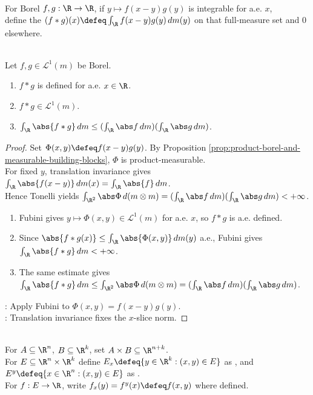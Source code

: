 \begin{definition} \label{def:convolution-real-line} \\
For Borel $f,g:\R\to\R$, if $y\mapsto f(x-y)g(y)$ is integrable for a.e. $x$,\\
define the  $(f*g)(x)\defeq\int_\R f(x-y)g(y)\,dm(y)$ on that full-measure set and $0$ elsewhere.
\end{definition}

\begin{proposition} \label{prop:l1-convolution-basic-bound} \\
Let $f,g\in\mathscr{L}^1(m)$ be Borel.
\begin{enumerate}[label=(\roman*)]
\setlength{\itemsep}{0pt}
\item $f*g$ is defined for a.e. $x\in\R$.
\item $f*g\in\mathscr{L}^1(m)$.
\item $\int_\R\abs{f*g}\,dm\leq(\int_\R\abs f\,dm)(\int_\R\abs g\,dm)$.
\end{enumerate}
\begin{proof}
Set $\Phi(x,y)\defeq f(x-y)g(y)$. By Proposition \ref{prop:product-borel-and-measurable-building-blocks}, $\Phi$ is product-measurable.\\
For fixed $y$, translation invariance gives $\int_\R\abs{f(x-y)}\,dm(x)=\int_\R\abs{f}\,dm$.\\
Hence Tonelli yields $\int_{\R^2}\abs\Phi\,d(m\otimes m)=(\int_\R\abs f\,dm)(\int_\R\abs g\,dm)<+\infty$.
\begin{enumerate}[label=(\roman*)]
\setlength{\itemsep}{0pt}
\item Fubini gives $y\mapsto\Phi(x,y)\in\mathscr{L}^1(m)$ for a.e. $x$, so $f*g$ is a.e. defined.
\item Since $\abs{f*g(x)}\leq\int_\R\abs{\Phi(x,y)}\,dm(y)$ a.e., Fubini gives $\int_\R\abs{f*g}\,dm<+\infty$.
\item The same estimate gives $\int_\R\abs{f*g}\,dm\leq\int_{\R^2}\abs\Phi\,d(m\otimes m)=(\int_\R\abs f\,dm)(\int_\R\abs g\,dm)$.
\end{enumerate}
: Apply Fubini to $\Phi(x,y)=f(x-y)g(y)$.\\
: Translation invariance fixes the $x$-slice norm.
\end{proof}
\end{proposition}

\begin{definition} \label{def:lebesgue-product-slices} \\
For $A\subseteq\R^n$, $B\subseteq\R^k$, set $A\times B\subseteq\R^{n+k}$.\\
For $E\subseteq\R^n\times\R^k$ define $E_x\defeq\{y\in\R^k:(x,y)\in E\}$ as , and  $E^y\defeq\{x\in\R^n:(x,y)\in E\}$ as .\\
For $f:E\to\R$, write $f_x(y)=f^y(x)\defeq f(x,y)$ where defined.
\end{definition}

